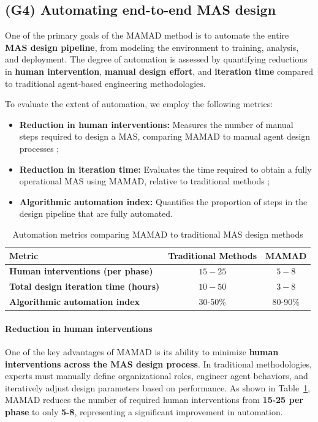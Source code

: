 \documentclass[pdflatex,sn-mathphys-num]{sn-jnl}%
\theoremstyle{thmstyleone}%
\theoremstyle{thmstyletwo}%
\theoremstyle{thmstylethree}%
\begin{document}
\subsection{(G4) Automating end-to-end MAS design}

One of the primary goals of the MAMAD method is to automate the entire \textbf{MAS design pipeline}, from modeling the environment to training, analysis, and deployment. The degree of automation is assessed by quantifying reductions in \textbf{human intervention}, \textbf{manual design effort}, and \textbf{iteration time} compared to traditional agent-based engineering methodologies.

To evaluate the extent of automation, we employ the following metrics:

\begin{itemize}
    \item \textbf{Reduction in human interventions:} Measures the number of manual steps required to design a MAS, comparing MAMAD to manual agent design processes ;
    \item \textbf{Reduction in iteration time:} Evaluates the time required to obtain a fully operational MAS using MAMAD, relative to traditional methods ;
    \item \textbf{Algorithmic automation index:} Quantifies the proportion of steps in the design pipeline that are fully automated.
\end{itemize}

\begin{table}[h!]
    \centering
    \caption{Automation metrics comparing MAMAD to traditional MAS design methods}
    \begin{tabular}{|l|c|c|}
        \hline
        \textbf{Metric} & \textbf{Traditional Methods} & \textbf{MAMAD} \\
        \hline
        \textbf{Human interventions (per phase)} & $15 - 25$ & $5 - 8$ \\
        \hline
        \textbf{Total design iteration time (hours)} & $10 - 50$ & $3 - 8$ \\
        \hline
        \textbf{Algorithmic automation index} & 30-50\% & 80-90\% \\
        \hline
    \end{tabular}
    \label{tab:automation}
\end{table}

\paragraph{Reduction in human interventions}
One of the key advantages of MAMAD is its ability to minimize \textbf{human interventions across the MAS design process}. In traditional methodologies, experts must manually define organizational roles, engineer agent behaviors, and iteratively adjust design parameters based on performance. As shown in Table~\ref{tab:automation}, MAMAD reduces the number of required human interventions from \textbf{15-25 per phase} to only \textbf{5-8}, representing a significant improvement in automation.
\end{document}
